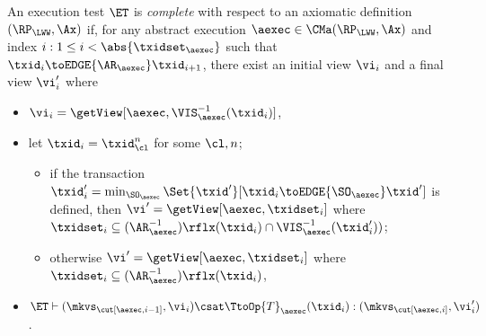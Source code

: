 \begin{definition}
\label{def:et_complete}
An execution test \(\ET\) is \emph{complete} with respect 
to an axiomatic definition \((\RP_{\LWW}, \Ax)\) if, for any abstract execution \(\aexec \in \CMa(\RP_{\LWW}, \Ax)\) 
and index \( i : 1 \leq i < \abs{\txidset_{\aexec}}\) such that \( \txid_{i} \toEDGE{\AR_{\aexec}} \txid_{i+1} \), there exist an initial view \(\vi_{i}\) and a final view \(\vi_{i}'\) where 
\begin{itemize}
\item \(\vi_{i} = \getView[\aexec, \VIS_{\aexec}^{-1}(\txid_{i})]\), 
\item let \(\txid_{i} = \txid_{\cl}^{n}\) for some \(\cl, n\); 
    \begin{itemize}
        \item if the transaction \(\txid_{i}' = \min_{\SO_{\aexec}}\Set{\txid' }[ \txid_i \toEDGE{\SO_{\aexec}} \txid']\) is defined, then \(\vi' = \getView[\aexec, \txidset_{i}]\) where \(\txidset_{i} \subseteq (\AR_{\aexec}^{-1})\rflx(\txid_{i}) \cap \VIS_{\aexec}^{-1}(\txid_{i}'))\); 
        \item otherwise \(\vi' = \getView[\aexec, \txidset_{i}]\) where \(\txidset_{i} \subseteq (\AR_{\aexec}^{-1})\rflx(\txid_{i})\), 
    \end{itemize}
\item \(\ET \vdash (\mkvs_{\cut[\aexec, i-1]}, \vi_{i}) \csat \TtoOp{T}_{\aexec}(\txid_{i}) : (\mkvs_{\cut[\aexec, i]},\vi_{i}')\).
\end{itemize}
\end{definition}

